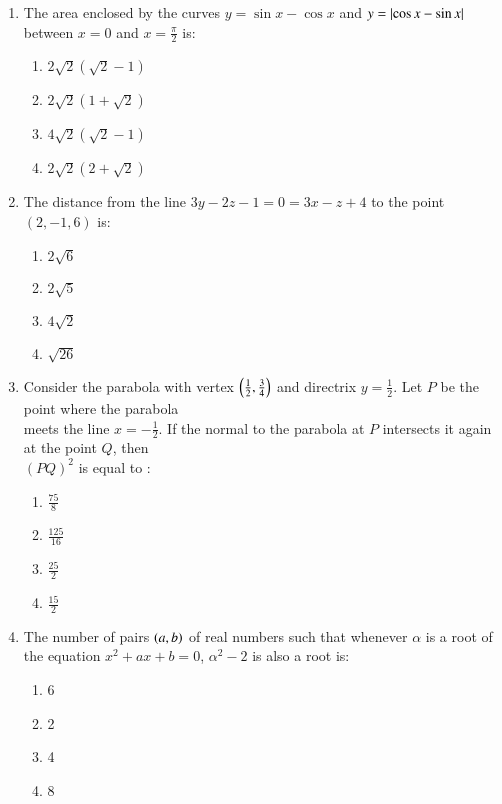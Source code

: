 \documentclass[journal,12pt,onecolumn]{IEEEtran}
\theoremstyle{remark}
\begin{document}
\begin{enumerate}
\item The area enclosed by the curves $y = \sin x - \cos x$ and $y = \left\vert\cos x - \sin x\right\vert$ between $x = 0$ and $x = \frac{\pi}{2}$ is:
\begin{multicols}{2}
\begin{enumerate}
    \item $2\sqrt{2}(\sqrt{2}-1)$\\
    \item $2\sqrt{2}(1+\sqrt{2})$
    \item $4\sqrt{2}(\sqrt{2}-1)$\\
    \item $2\sqrt{2}(2+\sqrt{2})$
\end{enumerate}
\end{multicols}
\item The distance from the line $3y - 2z - 1 = 0 = 3x - z + 4$ to the point $(2, -1, 6)$ is:
\begin{multicols}{2}
\begin{enumerate}
    \item $2\sqrt{6}$\\
    \item $2\sqrt{5}$
    \item $4\sqrt{2}$\\
    \item $\sqrt{26}$
\end{enumerate}
\end{multicols}

\item Consider the parabola with vertex $\left(\frac{1}{2}, \frac{3}{4}\right)$ and directrix $y = \frac{1}{2}$. Let $P$ be the point where the parabola\\ meets the line $x = -\frac{1}{2}$. If the normal to the parabola at $P$ intersects it again at the point $Q$, then\\ $(PQ)^2$ is equal to :
\begin{multicols}{2}
    \begin{enumerate}
    \item $\frac{75}{8}$\\
    \item $\frac{125}{16}$
    \item $\frac{25}{2}$\\
    \item $\frac{15}{2}$
\end{enumerate}
\end{multicols}


\item The number of pairs $\left(a, b\right)$ of real numbers such that whenever $\alpha$ is a root of the equation $x^2 + ax + b = 0$, $\alpha^2 - 2$ is also a root is:
\begin{multicols}{4}
\begin{enumerate}
    \item 6
    \item 2
    \item 4
    \item 8
\end{enumerate}
\end{multicols}


\end{enumerate}
\end{document}
